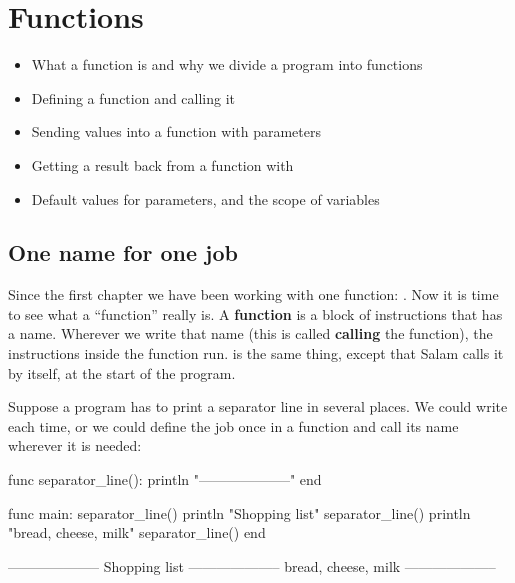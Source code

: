 \chapter{Functions}\label{ch:functions}

\begin{goals}
\begin{itemize}
  \item What a function is and why we divide a program into functions
  \item Defining a function and calling it
  \item Sending values into a function with parameters
  \item Getting a result back from a function with 
  \item Default values for parameters, and the scope of variables
\end{itemize}
\end{goals}

\section{One name for one job}

Since the first chapter we have been working with one function:
. Now it is time to see what a ``function'' really is. A
\textbf{function} is a block of instructions that has a name. Wherever we
write that name (this is called \textbf{calling} the function), the
instructions inside the function run.  is the same thing, except
that Salam calls it by itself, at the start of the program.

Suppose a program has to print a separator line in several places. We could
write  each time, or we could define
the job once in a function and call its name wherever it is needed:

\begin{salamcode}
func separator_line():
    println "--------------------"
end

func main:
    separator_line()
    println "Shopping list"
    separator_line()
    println "bread, cheese, milk"
    separator_line()
end
\end{salamcode}

\begin{salamout}
--------------------
Shopping list
--------------------
bread, cheese, milk
--------------------
\end{salamout}

